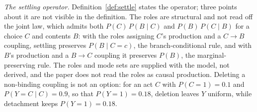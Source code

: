 \noindent\emph{The settling operator.} Definition~\ref{def:settle} states the operator; three points about it are not visible in the definition. The roles are structural and not read off the joint law, which admits both $P(C)\,P(B \mid C)$ and $P(B)\,P(C \mid B)$ for a choice $C$ and contents $B$: with the roles assigning $C$'s production and a $C \to B$ coupling, settling preserves $P(B \mid C = c)$, the branch-conditional rule, and with $B$'s production and a $B \to C$ coupling it preserves $P(B)$, the marginal-preserving rule. The roles and mode sets are supplied with the model, not derived, and the paper does not read the roles as causal production. Deleting a non-binding coupling is not an option: for an act $C$ with $P(C = 1) = 0.1$ and $P(Y = C \mid C) = 0.9$, so that $P(Y = 1) = 0.18$, deletion leaves $Y$ uniform, while detachment keeps $P(Y = 1) = 0.18$.

